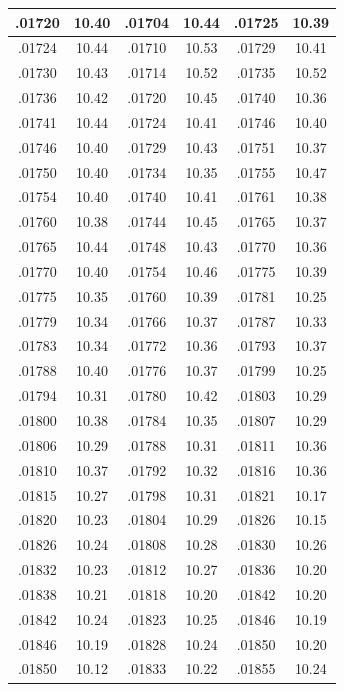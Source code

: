 \documentclass[11pt]{report}
\begin{document}
\begin{appendices}
\begin{longtable}{|c|c||c|c||c|c|}
.01720 & 10.40 & .01704 & 10.44 & .01725 & 10.39\\\hline
.01724 & 10.44 & .01710 & 10.53 & .01729 & 10.41\\\hline
.01730 & 10.43 & .01714 & 10.52 & .01735 & 10.52\\\hline
.01736 & 10.42 & .01720 & 10.45 & .01740 & 10.36\\\hline
.01741 & 10.44 & .01724 & 10.41 & .01746 & 10.40\\\hline
.01746 & 10.40 & .01729 & 10.43 & .01751 & 10.37\\\hline
.01750 & 10.40 & .01734 & 10.35 & .01755 & 10.47\\\hline
.01754 & 10.40 & .01740 & 10.41 & .01761 & 10.38\\\hline
.01760 & 10.38 & .01744 & 10.45 & .01765 & 10.37\\\hline
.01765 & 10.44 & .01748 & 10.43 & .01770 & 10.36\\\hline
.01770 & 10.40 & .01754 & 10.46 & .01775 & 10.39\\\hline
.01775 & 10.35 & .01760 & 10.39 & .01781 & 10.25\\\hline
.01779 & 10.34 & .01766 & 10.37 & .01787 & 10.33\\\hline
.01783 & 10.34 & .01772 & 10.36 & .01793 & 10.37\\\hline
.01788 & 10.40 & .01776 & 10.37 & .01799 & 10.25\\\hline
.01794 & 10.31 & .01780 & 10.42 & .01803 & 10.29\\\hline
.01800 & 10.38 & .01784 & 10.35 & .01807 & 10.29\\\hline
.01806 & 10.29 & .01788 & 10.31 & .01811 & 10.36\\\hline
.01810 & 10.37 & .01792 & 10.32 & .01816 & 10.36\\\hline
.01815 & 10.27 & .01798 & 10.31 & .01821 & 10.17\\\hline
.01820 & 10.23 & .01804 & 10.29 & .01826 & 10.15\\\hline
.01826 & 10.24 & .01808 & 10.28 & .01830 & 10.26\\\hline
.01832 & 10.23 & .01812 & 10.27 & .01836 & 10.20\\\hline
.01838 & 10.21 & .01818 & 10.20 & .01842 & 10.20\\\hline
.01842 & 10.24 & .01823 & 10.25 & .01846 & 10.19\\\hline
.01846 & 10.19 & .01828 & 10.24 & .01850 & 10.20\\\hline
.01850 & 10.12 & .01833 & 10.22 & .01855 & 10.24\\\hline

\end{longtable}
\end{appendices}
\end{document}
